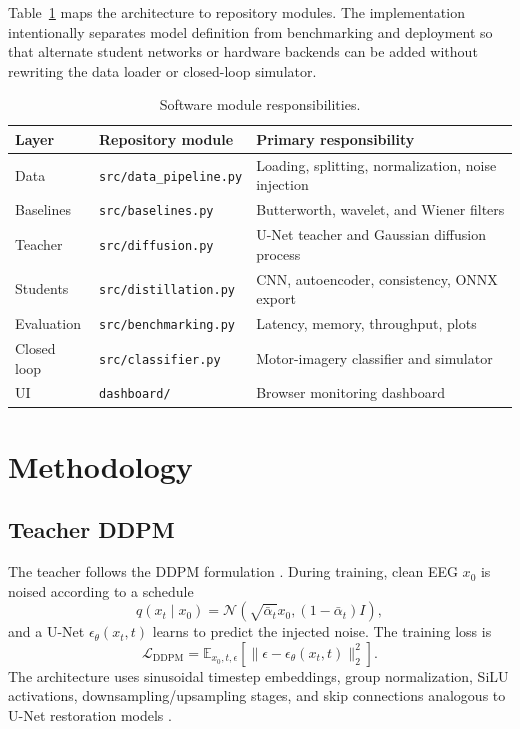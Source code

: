 \documentclass[11pt]{article}
\begin{document}
Table~\ref{tab:modules} maps the architecture to repository modules. The implementation intentionally separates model definition from benchmarking and deployment so that alternate student networks or hardware backends can be added without rewriting the data loader or closed-loop simulator.

\begin{table}[H]
    \centering
    \caption{Software module responsibilities.}
    \label{tab:modules}
    \small
    \begin{tabular}{lll}
        \toprule
        Layer & Repository module & Primary responsibility \\
        \midrule
        Data & \texttt{src/data\_pipeline.py} & Loading, splitting, normalization, noise injection \\
        Baselines & \texttt{src/baselines.py} & Butterworth, wavelet, and Wiener filters \\
        Teacher & \texttt{src/diffusion.py} & U-Net teacher and Gaussian diffusion process \\
        Students & \texttt{src/distillation.py} & CNN, autoencoder, consistency, ONNX export \\
        Evaluation & \texttt{src/benchmarking.py} & Latency, memory, throughput, plots \\
        Closed loop & \texttt{src/classifier.py} & Motor-imagery classifier and simulator \\
        UI & \texttt{dashboard/} & Browser monitoring dashboard \\
        \bottomrule
    \end{tabular}
\end{table}

\section{Methodology}

\subsection{Teacher DDPM}

The teacher follows the DDPM formulation \cite{ho2020ddpm}. During training, clean EEG \(x_0\) is noised according to a schedule
\[
q(x_t \mid x_0)=\mathcal{N}(\sqrt{\bar{\alpha}_t}x_0,(1-\bar{\alpha}_t)I),
\]
and a U-Net \( \epsilon_\theta(x_t,t) \) learns to predict the injected noise. The training loss is
\[
\mathcal{L}_{\mathrm{DDPM}} = \mathbb{E}_{x_0,t,\epsilon}
\left[\|\epsilon-\epsilon_\theta(x_t,t)\|_2^2\right].
\]
The architecture uses sinusoidal timestep embeddings, group normalization, SiLU activations, downsampling/upsampling stages, and skip connections analogous to U-Net restoration models \cite{ronneberger2015unet}.
\end{document}
